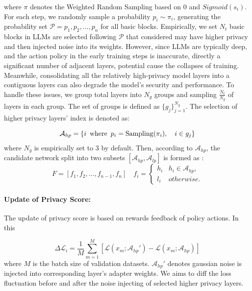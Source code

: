 \documentclass{article}
\begin{document}
where $\pi$ denotes the Weighted Random Sampling based on 0 and $Sigmoid(s_i)$. For each step, we randomly sample a probability $p_i \sim \pi_i$, generating the probability set $\mathcal{P} = {p_1,p_2,...,p_n}$ for all basic blocks.
Empirically, we set $N_t$ basic blocks in LLMs are selected following $\mathcal{P}$ that considered may have higher privacy and then injected noise into its weights. However, since LLMs are typically deep, and the action policy in the early training steps is inaccurate, directly a significant number of adjacent layers, potential cause the collapses of training. Meanwhile, consolidating all the relatively high-privacy model layers into a contiguous layers can also degrade the model’s security and performance. 
To handle these issues, we group total layers into $N_g$ groups and sampling $\frac{N_t}{N_g}$ of layers in each group. The set of groups is defined as $\{g_j\}_{j=1}^{N_g}$. The selection of higher privacy layers' index is denoted as:

\begin{equation}
\mathcal{A}_{hp} = \{i \hspace{0.5em} \text{where} \hspace{0.5em} p_i = \mathrm{Sampling}(\pi_i),\quad i \in g_j\}
\label{eq:ahp_definition}
\end{equation}
where $N_g$ is empirically set to 3 by default. Then, according to $\mathcal{A}_{hp}$, the candidate network split into two subsets $[\mathcal{A}_{hp},\mathcal{A}_{lp}]$ is formed as :
\begin{equation}
    F = [f_1, f_2, ... ,f_{n-1},f_n] \quad f_i =  \begin{cases}
                                                    h_i & h_i \in \mathcal{A}_{hp}, \\
                                                    l_i & otherwise.
                                                  \end{cases}
\end{equation}  

\paragraph{Update of Privacy Score:}
The update of privacy score is based on rewards feedback of policy actions. In this 

\begin{equation}
    \Delta\mathcal{L}_i = \frac{1}{M}\sum_{m=1}^M \left[\mathcal{L}(x_m;\mathcal{A}_{hp}') -\mathcal{L}(x_m;\mathcal{A}_{hp})\right]
\end{equation}
where $M$ is the batch size of validation datasets. $\mathcal{A}_{hp}'$ denotes gaussian noise is injected into corresponding layer's adapter weights. We aims to diff the loss fluctuation before and after the noise injecting of selected higher privacy layers. 
\end{document}
